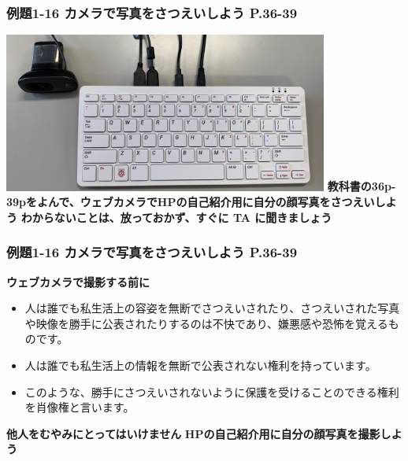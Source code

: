 \documentclass[dvipdfmx]{beamer}
\begin{document}
\begin{frame}[fragile]
	\frametitle{例題1-16 カメラで写真をさつえいしよう P.36-39~~~}
    \includegraphics[width=0.8\textwidth]{slide03_003.jpg}
    \vfill
    \large\textbf{教科書の36p-39pをよんで、ウェブカメラでHPの自己紹介用に自分の顔写真をさつえいしよう}
    \vfill
    \large\textbf{わからないことは、放っておかず、すぐに TA に聞きましょう}
\end{frame}

\begin{frame}[fragile]
	\frametitle{例題1-16 カメラで写真をさつえいしよう P.36-39~~~}
    \large\textbf{ウェブカメラで撮影する前に}
    \begin{itemize}
      \item 人は誰でも私生活上の容姿を無断でさつえいされたり、さつえいされた写真や映像を勝手に公表されたりするのは不快であり、嫌悪感や恐怖を覚えるものです。
      \item 人は誰でも私生活上の情報を無断で公表されない権利を持っています。
      \item このような、勝手にさつえいされないように保護を受けることのできる権利を肖像権と言います。
    \end{itemize}
    \vfill
    \large\textbf{他人をむやみにとってはいけません}
    \vfill
    \large\textbf{HPの自己紹介用に自分の顔写真を撮影しよう}
\end{frame}
\end{document}
